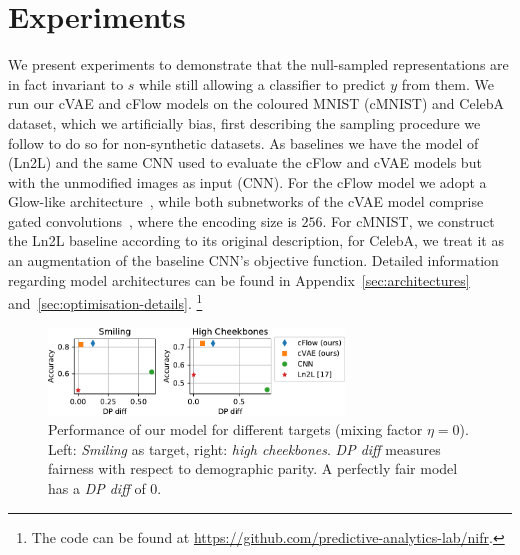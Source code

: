 
\section{Experiments}
\noindent We present experiments to demonstrate that the null-sampled representations are in fact invariant to $s$
while still allowing a classifier to predict $y$ from them.
We run our cVAE and cFlow models on the coloured MNIST (cMNIST) and CelebA dataset,
which we artificially bias, first describing the sampling procedure we follow to do so for non-synthetic datasets.
As baselines we have the model of~\citet{kim2019learning} (Ln2L) and the same CNN used to evaluate the cFlow and cVAE models
but with the unmodified images as input (CNN).
For the cFlow model we adopt a Glow-like architecture~\citep{KinDha18},
while both subnetworks of the cVAE model comprise gated convolutions~\citep{van2016conditional}, where the encoding size is $256$.
For cMNIST, we construct the Ln2L baseline according to its original description, for CelebA,
we treat it as an augmentation of the baseline CNN's objective function.
Detailed information regarding model architectures can be found in Appendix~\ref{sec:architectures} and~\ref{sec:optimisation-details}.%
\footnote{The code can be found at \url{https://github.com/predictive-analytics-lab/nifr}.}
\begin{figure}[tb]
    \centering
    \includegraphics[width=0.7\textwidth]{./Figures/nosinn_celeba.pdf}
    \caption{
        Performance of our model for different targets (mixing factor $\eta=0$).
        Left: \emph{Smiling} as target, right: \emph{high cheekbones}.
        \emph{DP diff} measures fairness with respect to demographic parity.
        A perfectly fair model has a \emph{DP diff} of 0.
    }%
    \label{fig:celeba-targets}
\end{figure}

